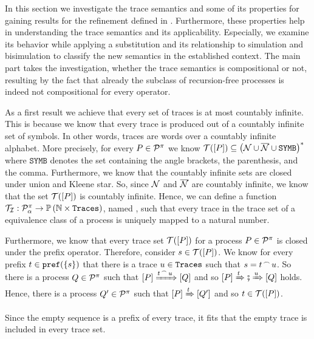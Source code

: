 In this section we investigate the trace semantics and some of its properties for gaining results for the refinement defined in . Furthermore, these properties help in understanding the trace semantics and its applicability. Especially, we examine its behavior while applying a substitution and its relationship to simulation and bisimulation to classify the new semantics in the established context. The main part takes the investigation, whether the trace semantics is compositional or not, resulting by the fact that already the subclass of recursion-free processes is indeed not compositional for every operator.

As a first result we achieve that every set of traces is at most countably infinite. This is because we know that every trace is produced out of a countably infinite set of symbols. In other words, traces are words over a countably infinite alphabet. More precisely, for every $P\in\mathcal P^{\pi}$ we know $\traces[P]\subseteq\left(\names\cup\conames\cup\mathtt{SYMB}\right)^*$ where $\mathtt{SYMB}$ denotes the set containing the angle brackets, the parenthesis, and the comma. Furthermore, we know that the countably infinite sets are closed under union and Kleene star. So, since $\mathcal N$ and $\overline{\mathcal N}$ are countably infinite, we know that the set $\traces[P]$ is countably infinite. Hence, we can define a function $\mathcal{T_I}:\mathcal P^{\pi}_\alpha\rightarrow\mathbb P\left(\mathbb N\times\mathtt{Traces}\right)$, named , such that every trace in the trace set of a equivalence class of a process is uniquely mapped to a natural number.

Furthermore, we know that every trace set $\traces[P]$ for a process $P\in\mathcal P^{\pi}$ is closed under the prefix operator. Therefore, consider $s\in\traces[P]$. We know for every prefix $t\in\pref{\set{s}}$ that there is a trace $u\in\mathtt{Traces}$ such that $s={t}^{\,\frown{}\,}{u}$. So there is a process $Q\in\mathcal P^{\pi}$ such that $\left[P\right]\xRightarrow{{t}^{\,\frown{}\,}{u}}\left[Q\right]$ and so $\left[P\right]\xRightarrow{t}\fatsemi\xRightarrow{u}\left[Q\right]$ holds. Hence, there is a process $Q'\in\mathcal P^{\pi}$ such that $\left[P\right]\xRightarrow{t}\left[Q'\right]$ and so $t\in\traces[P]$.

Since the empty sequence is a prefix of every trace, it fits that the empty trace is included in every trace set.

